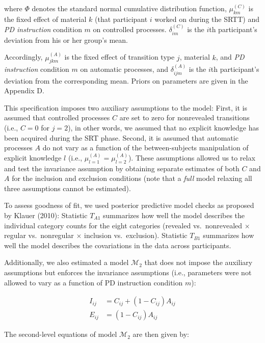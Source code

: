 \documentclass[man]{apa6}
\theoremstyle{definition}
\theoremstyle{definition}
\theoremstyle{definition}
\theoremstyle{remark}
\begin{document}
where \(\Phi\) denotes the standard normal cumulative distribution
function, \(\mu_{km}^{(C)}\) is the fixed effect of material \(k\) (that
participant \(i\) worked on during the SRTT) and \emph{PD instruction}
condition \(m\) on controlled processes. \(\delta_{im}^{(C)}\) is the
\(i\)th participant's deviation from his or her group's mean.

Accordingly, \(\mu_{jkm}^{(A)}\) is the fixed effect of transition type
\(j\), material \(k\), and \emph{PD instruction} condition \(m\) on
automatic processes, and \(\delta_{ijm}^{(A)}\) is the \(i\)th
participant's deviation from the corresponding mean. Priors on
parameters are given in the Appendix D.

This specification imposes two auxiliary assumptions to the model:
First, it is assumed that controlled processes \(C\) are set to zero for
nonrevealed transitions (i.e., \(C=0\) for \(j=2\)), in other words, we
assumed that no explicit knowledge has been acquired during the SRT
phase. Second, it is assumed that automatic processes \(A\) do not vary
as a function of the between-subjects manipulation of explicit knowledge
\(l\) (i.e., \(\mu^{(A)}_{l=1} = \mu^{(A)}_{l=2}\)). These assumptions
allowed us to relax and test the invariance assumption by obtaining
separate estimates of both \(C\) and \(A\) for the inclusion and
exclusion conditions (note that a \emph{full} model relaxing all three
assumptions cannot be estimated).

To assess goodness of fit, we used posterior predictive model checks as
proposed by Klauer (2010): Statistic \(T_{A1}\) summarizes how well the
model describes the individual category counts for the eight categories
(revealed vs.~nonrevealed \(\times\) regular vs.~nonregular \(\times\)
inclusion vs.~exclusion). Statistic \(T_{B1}\) summarizes how well the
model describes the covariations in the data across participants.

Additionally, we also estimated a model \(\mathcal{M}_2\) that does not
impose the auxiliary assumptions but enforces the invariance assumptions
(i.e., parameters were not allowed to vary as a function of PD
instruction condition \(m\)):

\[
\begin{aligned}
  I_{ij} & =  C_{ij} + (1-C_{ij}) A_{ij}\\
  E_{ij} & =  (1-C_{ij}) A_{ij}
\end{aligned}
\]

The second-level equations of model \(\mathcal{M}_2\) are then given by:
\end{document}
